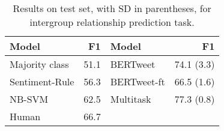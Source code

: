 \begin{table}[t]
	\centering
	\begin{tabular}{lr|lr}
		\toprule
		\textbf{Model} & \textbf{F1} & \textbf{Model} & \textbf{F1} \\ \midrule
		Majority class & 51.1 & BERTweet & 74.1 (3.3) \\
		Sentiment-Rule & 56.3 & BERTweet-ft & 66.5 (1.6) \\
		NB-SVM & 62.5 & Multitask & 77.3 (0.8) \\
        Human & 66.7 & & \\
        \bottomrule
	\end{tabular}
	\caption{Results on test set, with SD in parentheses, for intergroup relationship prediction task.}
	\label{tab:inoutresults}
\end{table}
